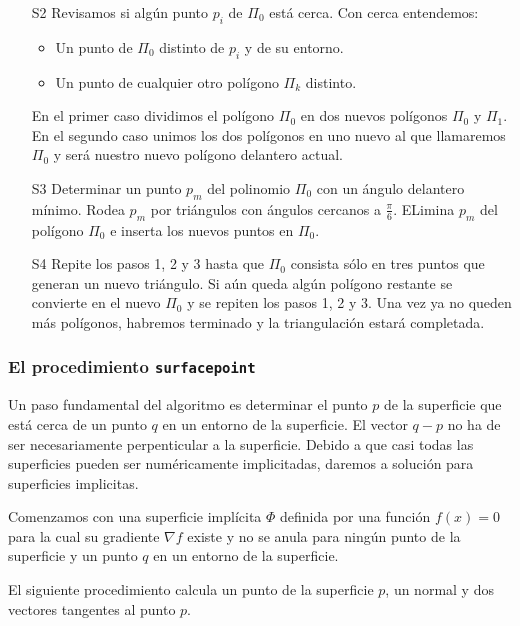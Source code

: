 \begin{enumerate}
	\item[S2] Revisamos si algún punto $p_i$ de $\Pi_0$ está cerca. Con cerca entendemos:
	\begin{itemize}
	\item Un punto de $\Pi_0$  distinto de $p_i$ y de su entorno.
	\item Un punto de cualquier otro polígono $\Pi_k$ distinto.
	\end{itemize}
	En el primer caso dividimos el polígono $\Pi_0$ en dos nuevos polígonos $\Pi_0$ y $\Pi_1$. En el segundo caso unimos los dos polígonos en uno nuevo al que llamaremos $\Pi_0$ y será nuestro nuevo polígono delantero actual.
	\item[S3] Determinar un punto $p_m$ del polinomio $\Pi_0$ con un ángulo delantero mínimo. Rodea $p_m$ por triángulos con ángulos cercanos a $\frac{\pi}{6}$. ELimina $p_m$ del polígono $\Pi_0$ e inserta los nuevos puntos en $\Pi_0$.
	\item[S4] Repite los pasos 1, 2 y 3 hasta que $\Pi_0$ consista sólo en tres puntos que generan un nuevo triángulo. Si aún queda algún polígono restante se convierte en el nuevo $\Pi_0$ y se repiten los pasos 1, 2 y 3. Una vez ya no queden más polígonos, habremos terminado y la triangulación estará completada.
\end{enumerate}

\subsubsection{El procedimiento \texttt{surfacepoint}}

Un paso fundamental del algoritmo es determinar el punto $p$ de la superficie que está cerca de un punto $q$ en un entorno de la superficie. El vector $q - p$ no ha de ser necesariamente perpenticular a la superficie. Debido a que casi todas las superficies pueden ser numéricamente implicitadas, daremos a solución para superficies implicitas.
\par Comenzamos con una superficie implícita $\Phi$ definida por una función $f(x) = 0$ para la cual su gradiente $\nabla f$ existe y no se anula para ningún punto de la superficie y un punto $q$ en un entorno de la superficie.
\par El siguiente procedimiento calcula un punto de la superficie $p$, un normal y dos vectores tangentes al punto $p$.

